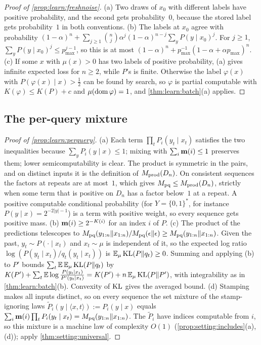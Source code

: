 \begin{proof}[Proof of \cref{prop:learn:freshnoise}]
(a) Two draws of $x_0$ with different labels have positive probability, and the second gets probability~$0$, because the stored label gets probability~$1$ in both conventions. (b) The labels at $x_0$ agree with probability $(1-\alpha)^n+\sum_{j\ge1}\binom nj\alpha^j(1-\alpha)^{n-j}\sum_yP(y\mid x_0)^j$. For $j\ge1$, $\sum_yP(y\mid x_0)^j\le p_{\max}^{j-1}$, so this is at most $(1-\alpha)^n+p_{\max}^{-1}(1-\alpha+\alpha p_{\max})^n$. (c) If some $x$ with $\mu(x)>0$ has two labels of positive probability, (a) gives infinite expected loss for $n\ge2$, while $P$'s is finite. Otherwise the label $\varphi(x)$ with $P(\varphi(x)\mid x)>\frac12$ can be found by search, so $\varphi$ is partial computable with $K(\varphi)\le K(P)+c$ and $\mu(\operatorname{dom}\varphi)=1$, and \cref{thm:learn:batch}(a) applies.
\end{proof}

\subsection{The per-query mixture}\label{app:learn:perquery}

\begin{proof}[Proof of \cref{prop:learn:perquery}]
(a) Each term $\prod_tP_i(y_t\mid x_t)$ satisfies the two inequalities because $\sum_yP_i(y\mid x)\le1$; mixing with $\sum_i\mathbf{m}(i)\le1$ preserves them; lower semicomputability is clear. The product is symmetric in the pairs, and on distinct inputs it is the definition of $M_{\mathrm{prod}}(D_n)$. On consistent sequences the factors at repeats are at most~$1$, which gives $M_{\mathrm{pq}}\le M_{\mathrm{prod}}(D_n)$, strictly when some term that is positive on $D_n$ has a factor below~$1$ at a repeat. A positive computable conditional probability (for $Y=\{0,1\}^*$, for instance $P(y\mid x)=2^{-2|y|-1}$) is a term with positive weight, so every sequence gets positive mass.
(b) $\mathbf{m}(i)\ge2^{-K(i)}$ for an index $i$ of $P$.
(c) The product of the predictions telescopes to $M_{\mathrm{pq}}(y_{1:n}\Vert x_{1:n})/M_{\mathrm{pq}}(\epsilon\Vert\epsilon)\ge M_{\mathrm{pq}}(y_{1:n}\Vert x_{1:n})$. Given the past, $y_t\sim P(\cdot\mid x_t)$ and $x_t\sim\mu$ is independent of it, so the expected log ratio $\log(P(y_t\mid x_t)/q_t(y_t\mid x_t))$ is $\mathbb{E}_\mu\operatorname{KL}(P\|q_t)\ge0$. Summing and applying (b) to $P'$ bounds $\sum_t\mathbb{E}\,\mathbb{E}_\mu\operatorname{KL}(P\|q_t)$ by $K(P')+\sum_t\mathbb{E}\log\frac{P(y_t\mid x_t)}{P'(y_t\mid x_t)}=K(P')+n\,\mathbb{E}_\mu\operatorname{KL}(P\|P')$, with integrability as in \cref{thm:learn:batch}(b). Convexity of $\operatorname{KL}$ gives the averaged bound.
(d) Stamping makes all inputs distinct, so on every sequence the set mixture of the stamp-ignoring laws $\tilde P_i(y\mid\langle x,t\rangle):=P_i(y\mid x)$ equals $\sum_i\mathbf{m}(i)\prod_tP_i(y_t\mid x_t)=M_{\mathrm{pq}}(y_{1:n}\Vert x_{1:n})$. The $\tilde P_i$ have indices computable from $i$, so this mixture is a machine law of complexity $O(1)$ (\cref{prop:setting:includes}(a),(d)); apply \cref{thm:setting:universal}.
\end{proof}

